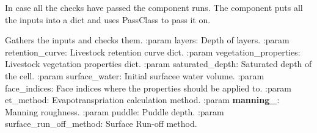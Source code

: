 \documentclass[letterpaper,10pt,english]{sphinxmanual}
\begin{document}
\begin{fulllineitems}

\begin{fulllineitems}
\label{\detokenize{cmf:livestock.components.comp_cmf.CMFGround.run}}
In case all the checks have passed the component runs.
The component puts all the inputs into a dict and uses PassClass to pass it on.

\end{fulllineitems}


\begin{fulllineitems}
\label{\detokenize{cmf:livestock.components.comp_cmf.CMFGround.run_checks}}
Gathers the inputs and checks them.
:param layers: Depth of layers.
:param retention\_curve: Livestock retention curve dict.
:param vegetation\_properties: Livestock vegetation properties dict.
:param saturated\_depth: Saturated depth of the cell.
:param surface\_water: Initial surfacee water volume.
:param face\_indices: Face indices where the properties should be applied to.
:param et\_method: Evapotranspriation calculation method.
:param {\color{red}\bfseries{}manning\_}: Manning roughness.
:param puddle: Puddle depth.
:param surface\_run\_off\_method: Surface Run-off method.

\end{fulllineitems}


\end{fulllineitems}

\end{document}
